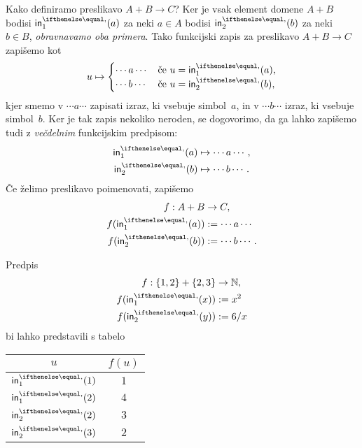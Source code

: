 Kako definiramo preslikavo $A + B \to C$? Ker je vsak element domene $A + B$ bodisi
$\inl(a)$ za neki $a \in A$ bodisi $\inr(b)$ za neki $b \in B$, \emph{obravnavamo oba
  primera}. Tako funkcijski zapis za preslikavo $A + B \to C$ zapišemo kot
%
\begin{equation*}
  u \mapsto
  \begin{cases}
    \cdots a \cdots & \text{če $u = \inl(a)$,}\\
    \cdots b \cdots & \text{če $u = \inr(b)$,}
  \end{cases}
\end{equation*}
%
kjer smemo v $\cdots a \cdots$ zapisati izraz, ki vsebuje simbol~$a$, in v
$\cdots b \cdots$ izraz, ki vsebuje simbol~$b$. Ker je tak zapis nekoliko neroden, se
dogovorimo, da ga lahko zapišemo tudi z \emph{večdelnim} funkcijskim predpisom:
%
\begin{align*}
  \inl(a) &\mapsto \cdots a \cdots, \\
  \inr(b) &\mapsto \cdots b \cdots.
\end{align*}
%
Če želimo preslikavo poimenovati, zapišemo
%
\begin{align*}
  f : A + B &\to C, \\
  f(\inl(a)) &\dfeq \cdots a \cdots \\
  f(\inr(b)) &\dfeq \cdots b \cdots.
\end{align*}

\begin{zgled}
  Predpis
  \begin{align*}
    f : \set{1, 2} + \set{2, 3} &\to \NN, \\
    f(\inl(x)) &\dfeq x^2 \\
    f(\inr(y)) &\dfeq 6 / x
  \end{align*}
  bi lahko predstavili s tabelo
  \begin{center}
    \begin{tabular}{cc}
      \toprule
      $u$ & $f(u)$ \\ \midrule
      $\inl(1)$ & $1$ \\
      $\inl(2)$ & $4$ \\
      $\inr(2)$ & $3$ \\
      $\inr(3)$ & $2$ \\ \bottomrule
    \end{tabular}
  \end{center}
\end{zgled}

